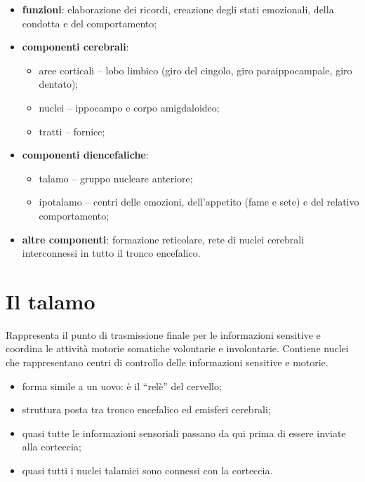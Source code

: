 \begin{itemize}
  \item \textbf{funzioni}: elaborazione dei ricordi, creazione degli stati
    emozionali, della condotta e del comportamento;
  \item \textbf{componenti cerebrali}:
    \begin{itemize}
      \item aree corticali -- lobo limbico (giro del cingolo, giro
        paraippocampale, giro dentato);
      \item nuclei -- ippocampo e corpo amigdaloideo;
      \item tratti -- fornice;
    \end{itemize}
  \item \textbf{componenti diencefaliche}:
    \begin{itemize}
      \item talamo -- gruppo nucleare anteriore;
      \item ipotalamo -- centri delle emozioni, dell'appetito (fame e sete) e
        del relativo comportamento;
    \end{itemize}
  \item \textbf{altre componenti}: formazione reticolare, rete di nuclei
    cerebrali interconnessi in tutto il tronco encefalico.
\end{itemize}

\section{Il talamo}

Rappresenta il punto di trasmissione finale per le informazioni sensitive e
coordina le attività motorie somatiche volontarie e involontarie. Contiene
nuclei che rappresentano centri di controllo delle informazioni sensitive e
motorie.

\begin{itemize}
  \item forma simile a un uovo: è il ``relè'' del cervello;
  \item struttura posta tra tronco encefalico ed emisferi cerebrali;
  \item quasi tutte le informazioni sensoriali passano da qui prima di essere
    inviate alla corteccia;
  \item quasi tutti i nuclei talamici sono connessi con la corteccia.
\end{itemize}

